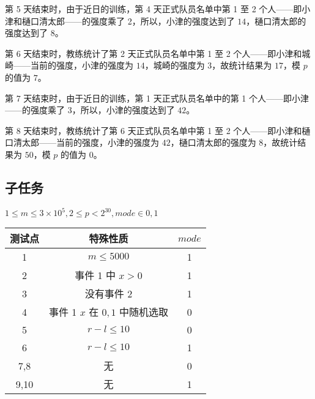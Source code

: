 第 5 天结束时，由于近日的训练，第 4 天正式队员名单中第 1 至 2 个人——即小津和樋口清太郎——的强度乘了 2，所以，小津的强度达到了 $14$，樋口清太郎的强度达到了 $8$。

第 6 天结束时，教练统计了第 2 天正式队员名单中第 1 至 2 个人——即小津和城崎——当前的强度，小津的强度为 $14$，城崎的强度为 $3$，故统计结果为 $17$，模 $p$ 的值为 $7$。

第 7 天结束时，由于近日的训练，第 1 天正式队员名单中的第 1 个人——即小津——的强度乘了 3，所以，小津的强度达到了 $42$。

第 8 天结束时，教练统计了第 6 天正式队员名单中第 1 至 2 个人——即小津和樋口清太郎——当前的强度，小津的强度为 $42$，樋口清太郎的强度为 $8$，故统计结果为 $50$，模 $p$ 的值为 $0$。


\subsection*{子任务}

$1 \le m \le 3 \times 10^5, 2 \le p < 2^{30}, mode \in { 0, 1 }$

\begin{table}[htbp]
\centering
\begin{tabular}{ccc}
    \toprule
    测试点 & 特殊性质 & $mode$ \\
    \midrule
    1 & $m \le 5000$ & 1 \\
    2 & 事件 1 中 $x > 0$ & 1 \\
    3 & 没有事件 2 & 1 \\
    4 & 事件 1 $x$ 在 $0,1$ 中随机选取 & 0 \\
    5 & $r-l\le 10$ & 0 \\
    6 & $r-l\le 10$ & 1 \\
    7,8 & 无 & 0 \\
    9,10 & 无 & 1 \\
    \bottomrule
\end{tabular}
\end{table}